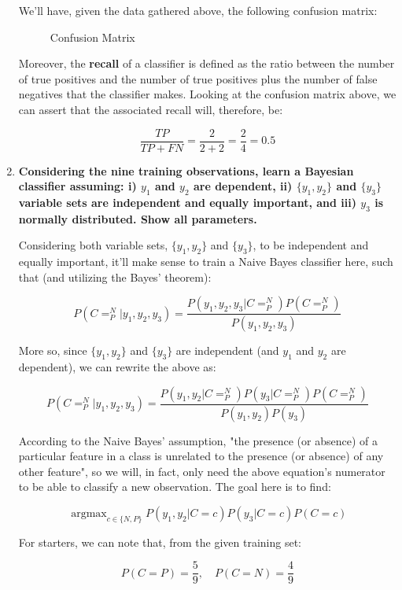 \documentclass[12pt]{article}
\begin{document}
\begin{enumerate}[leftmargin=\labelsep]
  We'll have, given the data gathered above, the following confusion matrix:

  \begin{figure}[H]
    \centering
    
    \caption{Confusion Matrix}
  \end{figure}

  Moreover, the \textbf{recall} of a classifier is defined as the ratio between the number of
  true positives and the number of true positives plus the number of false negatives that the
  classifier makes. Looking at the confusion matrix above, we can assert that the associated
  recall will, therefore, be:

  $$
  \frac{TP}{TP + FN} = \frac{2}{2 + 2} = \frac{2}{4} = 0.5
  $$

  \pagebreak

  \item \textbf{Considering the nine training observations, learn a Bayesian classifier assuming:
  i) $y_1$ and $y_2$ are dependent, ii) $\{y_1 , y_2\}$ and $\{y_3 \}$ variable sets are
  independent and equally important, and iii) $y_3$ is normally distributed. Show all parameters.}

  Considering both variable sets, $\{y_1, y_2\}$ and $\{y_3\}$, to be independent and equally important,
  it'll make sense to train a Naive Bayes classifier here, such that (and utilizing the
  Bayes' theorem):

  $$
  P(C = ^N_P | y_1, y_2, y_3) = \frac{P(y_1, y_2, y_3 | C = ^N_P) P(C = ^N_P)}{P(y_1, y_2, y_3)}
  $$

  More so, since $\{y_1, y_2\}$ and $\{y_3\}$ are independent (and $y_1$ and $y_2$ are dependent),
  we can rewrite the above as:

  $$
  P(C = ^N_P | y_1, y_2, y_3) = \frac{P(y_1, y_2 | C = ^N_P) P(y_3 | C = ^N_P) P(C = ^N_P)}{P(y_1, y_2) P(y_3)}
  $$

  According to the Naive Bayes' assumption, "the presence (or absence) of a particular feature
  in a class is unrelated to the presence (or absence) of any other feature", so we will, in fact,
  only need the above equation's numerator to be able to classify a new observation.
  The goal here is to find:

  $$
  \operatorname{argmax}_{c \in \{N, P\}} P(y_1, y_2 | C = c) P(y_3 | C = c) P(C = c)
  $$

  For starters, we can note that, from the given training set:
  
  $$
  P(C = P) = \frac{5}{9}, \quad P(C = N) = \frac{4}{9}
  $$


\end{enumerate}
\end{document}
